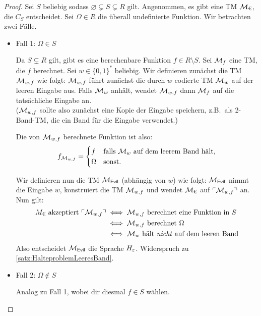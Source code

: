 \begin{proof}
  Sei $S$ beliebig sodass $\varnothing \subsetneq S \subsetneq R$ gilt.
  Angenommen, es gibt eine \ac{TM} $\mathcal{M}_\text{€}$, die $C_S$ entscheidet.
  Sei $\Omega \in R$ die überall undefinierte Funktion. 
  Wir betrachten zwei Fälle.
  \begin{itemize}
   \item Fall 1: $\Omega \in S$
   
     Da $S\subsetneq R$ gilt, gibt es eine berechenbare Funktion $f \in R \setminus S$.
     Sei $\mathcal{M}_f$ eine \ac{TM}, die $f$ berechnet.
     Sei $w\in\{0,1\}^*$ beliebig.
     Wir definieren zunächst die \ac{TM} $\mathcal{M}_{w, f}$ wie folgt:
     $\mathcal{M}_{w, f}$ führt zunächst die durch $w$ codierte \ac{TM} $\mathcal{M}_w$ auf der leeren Eingabe aus.
     Falls $\mathcal{M}_w$ anhält, wendet $\mathcal{M}_{w, f}$ dann $\mathcal{M}_f$ auf die tatsächliche Eingabe an.\\
     ($\mathcal{M}_{w, f}$ sollte also zunächst eine Kopie der Eingabe speichern,
     z.B.\ als 2-Band-\ac{TM}, die ein Band für die Eingabe verwendet.)
     
     Die von $\mathcal{M}_{w, f}$ berechnete Funktion ist also:
     $$f_{\mathcal{M}_{w, f}}=\begin{cases}
                      f & \text{falls } \mathcal{M}_w \text{ auf dem leerem Band hält,}\\
                      \Omega & \text{sonst.}
                      \end{cases}$$
     
     Wir definieren nun die \ac{TM} $\mathcal{M}_\textsf{Evil}$ (abhängig von $w$) wie folgt:
     $\mathcal{M}_\textsf{Evil}$ nimmt die Eingabe $w$, konstruiert die \ac{TM} $\mathcal{M}_{w, f}$ und wendet $\mathcal{M}_\text{€}$ auf $\ulcorner \mathcal{M}_{w, f} \urcorner$ an.
     Nun gilt:
     \begin{align*}
      M_\text{€} \text{ akzeptiert } \godel{\M_{w, f}}
      &\iff \M_{w, f} \text{ berechnet eine Funktion in }S\\
      &\iff \M_{w, f} \text{ berechnet }\Omega\\ %
      &\iff \M_w \text{ hält \emph{nicht} auf dem leeren Band}
    \end{align*}
    Also entscheidet $\mathcal{M}_\textsf{Evil}$ die Sprache $H_\varepsilon$. Widerspruch zu \autoref{satz:HalteproblemLeeresBand}.
    \item Fall 2: $\Omega \notin S$
    
    Analog zu Fall 1, wobei dir diesmal $f\in S$ wählen. \qedhere
  \end{itemize}
\end{proof}

